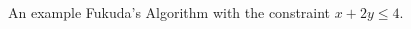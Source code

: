 \begin{frame}{An example}
Fukuda's Algorithm with the constraint $ x+2y \leq 4 $.
\begin{columns}[c]
\begin{column}{5cm}
\end{column}
\begin{column}{5cm}



\end{column}
\end{columns}
\end{frame}
